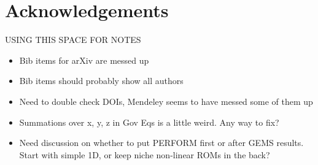 \chapter{Acknowledgements}

{\color{red}
USING THIS SPACE FOR NOTES
\begin{itemize}
	\item Bib items for arXiv are messed up
	\item Bib items should probably show all authors
	\item Need to double check DOIs, Mendeley seems to have messed some of them up
	\item Summations over x, y, z in Gov Eqs is a little weird. Any way to fix?
	\item Need discussion on whether to put PERFORM first or after GEMS results. Start with simple 1D, or keep niche non-linear ROMs in the back?
\end{itemize}

}
